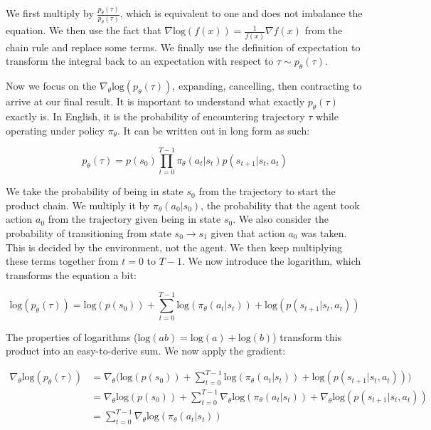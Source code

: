     We first multiply by $\frac{p_{\theta}(\tau)}{p_{\theta}(\tau)}$, which is equivalent to one and does not imbalance the equation. We then use the fact that $\nabla \mathrm{log}(f(x)) = \frac{1}{f(x)}\nabla f(x)$ from the chain rule and replace some terms. We finally use the definition of expectation to transform the integral back to an expectation with respect to $\tau \sim p_\theta(\tau)$. 

    Now we focus on the $\nabla_\theta \mathrm{log}(p_\theta(\tau))$, expanding, cancelling, then contracting to arrive at our final result. It is important to understand what exactly $p_\theta(\tau)$ exactly is. In English, it is the probability of encountering trajectory $\tau$ while operating under policy $\pi_\theta$. It can be written out in long form as such:

    $$p_\theta(\tau) = p(s_0) \prod_{t=0}^{T-1} \pi_\theta(a_t|s_t)p(s_{t+1}|s_t,a_t)$$

    We take the probability of being in state $s_0$ from the trajectory to start the product chain. We multiply it by $\pi_\theta(a_0|s_0)$, the probability that the agent took action $a_0$ from the trajectory given being in state $s_0$. We also consider the probability of transitioning from state $s_0 \rightarrow s_1$ given that action $a_0$ was taken. This is decided by the environment, not the agent. We then keep multiplying these terms together from $t=0$ to $T-1$. We now introduce the logarithm, which transforms the equation a bit:

    $$\mathrm{log}(p_\theta(\tau)) = \mathrm{log}(p(s_0)) + \sum_{t=0}^{T-1} \mathrm{log}(\pi_\theta(a_t|s_t)) + \mathrm{log}(p(s_{t+1}|s_t,a_t))$$

    The properties of logarithms ($\mathrm{log}(ab) = \mathrm{log}(a) + \mathrm{log}(b)$) transform this product into an easy-to-derive sum. We now apply the gradient:
    
    \begin{align*}
        \nabla_\theta \mathrm{log}(p_\theta(\tau)) &= \nabla_\theta \biggl(\mathrm{log}(p(s_0)) + \sum_{t=0}^{T-1} \mathrm{log}(\pi_\theta(a_t|s_t)) + \mathrm{log}(p(s_{t+1}|s_t,a_t))\biggr)\\
        &= \nabla_\theta \mathrm{log}(p(s_0)) + \sum_{t=0}^{T-1} \nabla_\theta\mathrm{log}(\pi_\theta(a_t|s_t)) + \nabla_\theta\mathrm{log}(p(s_{t+1}|s_t,a_t)) \\
        &= \sum_{t=0}^{T-1} \nabla_\theta\mathrm{log}(\pi_\theta(a_t|s_t))
    \end{align*}

